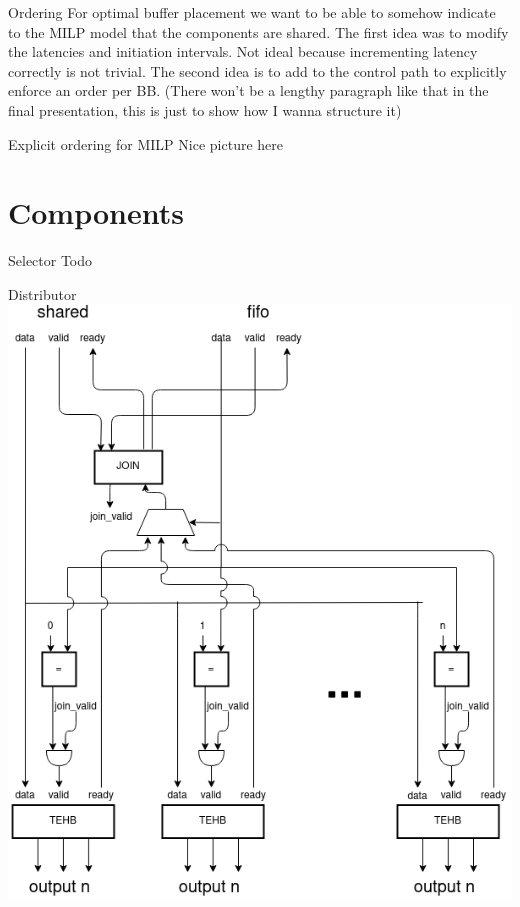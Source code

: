 \documentclass{beamer}
\begin{document}
\begin{frame}{Ordering}
For optimal buffer placement we want to be able to somehow indicate to the MILP model that the components are shared. The first idea was to modify the latencies and initiation intervals. Not ideal because incrementing latency correctly is not trivial. The second idea is to add to the control path to explicitly enforce an order per BB. (There won't be a lengthy paragraph like that in the final presentation, this is just to show how I wanna structure it)
\end{frame}

\begin{frame}{Explicit ordering for MILP}
Nice picture here
\end{frame}

\section{Components}
\begin{frame}{Selector}
Todo
\end{frame}

\begin{frame}{Distributor}
    \includegraphics[scale=0.3]{distributor.png}
\end{frame}
\end{document}
